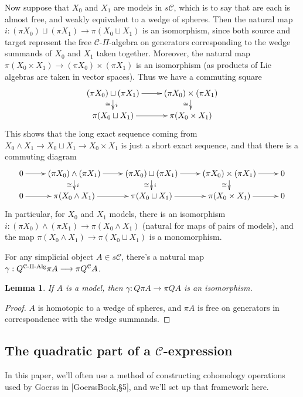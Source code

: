 \documentclass[11pt]{amsart}
\theoremstyle{plain}
\newtheorem{lem}[thm]{Lemma}
\theoremstyle{definition}
\renewcommand{\to}{\longrightarrow}
\newcommand{\calC}{\mathcal{C}}
\theoremstyle{plain}
\newcommand{\PiAlg}{\textup{-$\Pi$-Alg}}
\begin{document}
\begin{Conventions and notation}
Now suppose that $X_0$ and $X_1$ are models in $s\calC$, which is to say that are each is almost free, and weakly equivalent to a wedge of spheres. Then the natural map $i:(\pi X_0)\sqcup (\pi X_1)\to \pi(X_0\sqcup X_1)$ is an isomorphism, since both source and target represent the free $\calC$-$\Pi$-algebra on generators corresponding to the wedge summands of $X_0$ and $X_1$ taken together. Moreover, the natural map $\pi(X_0\times X_1)\to (\pi X_0)\times (\pi X_1)$ is an isomorphism (as products of Lie algebras are taken in vector spaces). Thus we have a commuting square
\[\xymatrix@R=4mm{
(\pi X_0)\sqcup (\pi X_1)
\ar[r]
\ar[d]^-{i}_-{\cong}
&%
(\pi X_0)\times (\pi X_1)
\ar[d]_-{\cong}\\
\pi (X_0\sqcup X_1)
\ar[r]
&%
\pi (X_0\times X_1)
}\]
This shows that the long exact sequence coming from $X_0\wedge X_1\to X_0\sqcup X_1\to X_0\times X_1$ is just a short exact sequence, and that there is a commuting diagram
\[\xymatrix@R=4mm{
0\ar[r]&%
(\pi X_0)\wedge (\pi X_1)
\ar[r]
\ar[d]^-{i}_-{\cong}
&%
(\pi X_0)\sqcup (\pi X_1)
\ar[r]
\ar[d]^-{i}_-{\cong}
&%
(\pi X_0)\times (\pi X_1)
\ar[r]
\ar[d]_-{\cong}
&%
0\\%
0\ar[r]&%
\pi (X_0\wedge  X_1)
\ar[r]
&%
\pi (X_0\sqcup X_1)
\ar[r]
&%
\pi (X_0\times X_1)
\ar[r]
&%
0
}\]
In particular, for $X_0$ and $X_1$ models, there is an isomorphism $i:(\pi X_0)\wedge (\pi X_1)\to\pi(X_0\wedge X_1)$ (natural for maps of pairs of models), and the map $\pi(X_0\wedge X_1)\to \pi(X_0\sqcup X_1)$ is a monomorphism.

For any simplicial object $A\in s\calC$, there's a natural map $\gamma:Q^{\calC\PiAlg}\pi A\to \pi Q^{\calC}A$.
\begin{lem}
If $A$ is a model, then $\gamma:Q\pi A\to \pi QA$ is an isomorphism.
\end{lem}
\begin{proof}
$A$ is homotopic to a wedge of spheres, and $\pi A$ is free on generators in correspondence with the wedge summands.
\end{proof}

\subsection{The quadratic part of a $\calC$-expression}\label{quadratic part section}
In this paper, we'll often use a method of constructing cohomology operations used by Goerss in [GoerssBook,\S5], and we'll set up that framework here.


\end{Conventions and notation}
\end{document}
